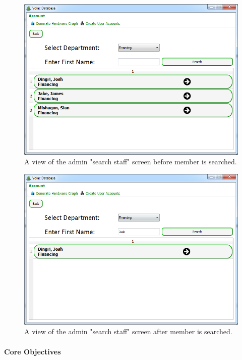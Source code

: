 \begin{figure}[H]
    \includegraphics[width=\textwidth]{./Evaluation/Images/beforeadv.png}
    \caption{A view of the admin "search staff" screen before member is searched.} 
\end{figure}

\begin{figure}[H]
    \includegraphics[width=\textwidth]{./Evaluation/Images/afteradv.png}
    \caption{A view of the admin "search staff" screen after member is searched.} 
\end{figure}



\paragraph{Core Objectives}

